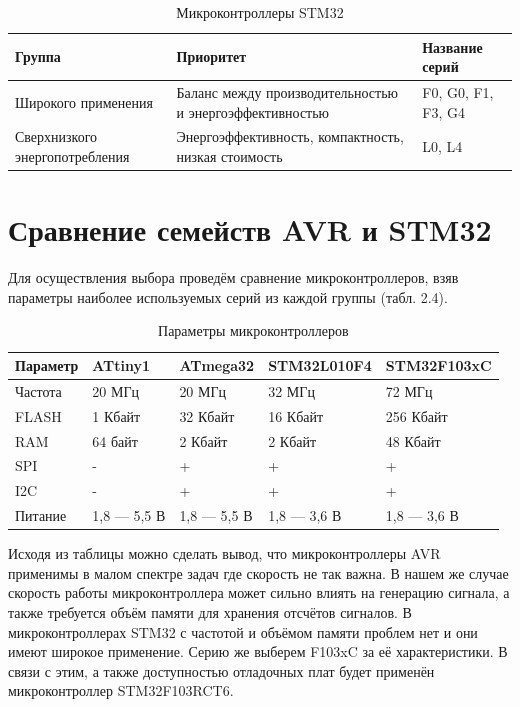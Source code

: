 \begin{table}[H]
\caption{Микроконтроллеры STM32}
\begin{tabular}{|p{3.25 cm}|p{8 cm}|p{4 cm}|}
\hline
Группа & Приоритет & Название серий \\ \hline
Широкого применения & Баланс между производительностью и энергоэффективностью & F0, G0, F1, F3,
G4 \\ \hline
Сверхнизкого энергопотребления & Энергоэффективность, компактность, низкая стоимость & L0, L4 \\ \hline
\end{tabular}
\end{table}

\section{Сравнение семейств AVR и STM32}
	
	Для осуществления выбора проведём сравнение микроконтроллеров, взяв параметры наиболее используемых серий из каждой группы (табл. 2.4).
	
\begin{table}[H]
\caption{Параметры микроконтроллеров}
\begin{tabular}{|p{2.5 cm}|p{3 cm}|p{3 cm}|p{3.1 cm}|p{3.1 cm}|}
\hline
        Параметр & ATtiny1 & ATmega32 & STM32L010F4 & STM32F103xC \\ \hline
        Частота & 20 МГц & 20 МГц & 32 МГц & 72 МГц \\ \hline
        FLASH & 1 Кбайт & 32 Кбайт & 16 Кбайт & 256 Кбайт \\ \hline
        RAM & 64 байт & 2 Кбайт & 2 Кбайт & 48 Кбайт \\ \hline
        SPI & - & + & + & + \\ \hline
        I2C & - & +	 & + & + \\ \hline
        Питание & 1,8 --- 5,5 В & 1,8 --- 5,5 В & 1,8 --- 3,6 В & 1,8 --- 3,6 В \\ \hline
\end{tabular}
\end{table}
	
	Исходя из таблицы можно сделать вывод, что микроконтроллеры AVR применимы в малом спектре задач где скорость не так важна. В нашем же случае скорость работы микроконтроллера может сильно влиять на генерацию сигнала, а также требуется объём памяти для хранения отсчётов сигналов. В микроконтроллерах STM32 с частотой и объёмом памяти проблем нет и они имеют широкое применение. Серию же выберем F103xC за её характеристики. В связи с этим, а также доступностью отладочных плат будет применён микроконтроллер STM32F103RCT6.


